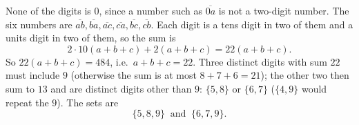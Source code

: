 None of the digits is $0$, since a number such as $\overline{0a}$ is not a two-digit number. The six numbers are $\overline{ab},\overline{ba},\overline{ac},\overline{ca},\overline{bc},\overline{cb}$. Each digit is a tens digit in two of them and a units digit in two of them, so the sum is
\[
2\cdot10(a+b+c)+2(a+b+c)=22(a+b+c).
\]
So $22(a+b+c)=484$, i.e.\ $a+b+c=22$. Three distinct digits with sum $22$ must include $9$ (otherwise the sum is at most $8+7+6=21$); the other two then sum to $13$ and are distinct digits other than $9$: $\{5,8\}$ or $\{6,7\}$ ($\{4,9\}$ would repeat the $9$). The sets are
\[
\boxed{\{5,8,9\}\ \text{ and }\ \{6,7,9\}}.
\]
